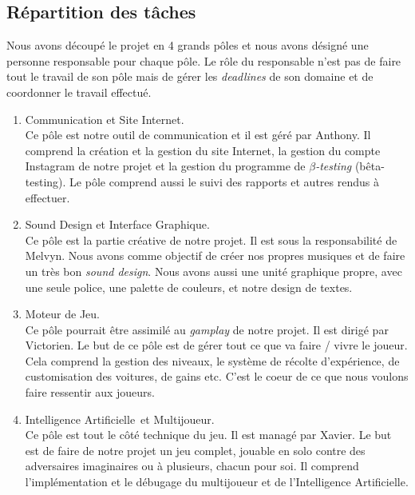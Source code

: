 \documentclass[11pt,a4paper]{article}
\newcommand{\AI}{Intelligence Artificielle}
\begin{document}
  \subsection{Répartition des tâches} 
    Nous avons découpé le projet en 4 grands pôles et nous avons désigné une personne responsable
    pour chaque pôle. Le rôle du responsable n'est pas de faire tout le travail de son pôle mais
    de gérer les \textit{deadlines} de son domaine et de coordonner le travail effectué.
    \begin{enumerate}
      \item Communication et Site Internet.\\
        Ce pôle est notre outil de communication et il est géré par Anthony. Il comprend la création
        et la gestion du site Internet, la gestion du compte Instagram de notre projet \cite{insta} et la
        gestion du programme de \(\beta\)\textit{-testing} (bêta-testing). Le pôle comprend aussi le suivi
        des rapports et autres rendus à effectuer. 
      \item Sound Design et Interface Graphique.\\
        Ce pôle est la partie créative de notre projet. Il est sous la responsabilité de Melvyn.
        Nous avons comme objectif de créer nos propres musiques et de faire un très bon \textit{sound design}.
        Nous avons aussi une unité graphique propre, avec une seule police, une palette de couleurs, et notre
        design de textes.
      \item Moteur de Jeu.\\
        Ce pôle pourrait être assimilé au \textit{gamplay} de notre projet. Il est dirigé par Victorien.
        Le but de ce pôle est de gérer tout ce que va faire / vivre le joueur. Cela comprend la gestion des niveaux,
        le système de récolte d'expérience, de customisation des voitures, de gains etc. C'est le coeur 
        de ce que nous voulons faire ressentir aux joueurs.
      \item \AI\, et Multijoueur.\\
        Ce pôle est tout le côté technique du jeu. Il est managé par Xavier. Le but est de faire de notre projet
        un jeu complet, jouable en solo contre des adversaires imaginaires ou à plusieurs, chacun pour soi. Il 
        comprend l'implémentation et le débugage du multijoueur et de l'\AI.
    \end{enumerate}
  \clearpage
\end{document}
